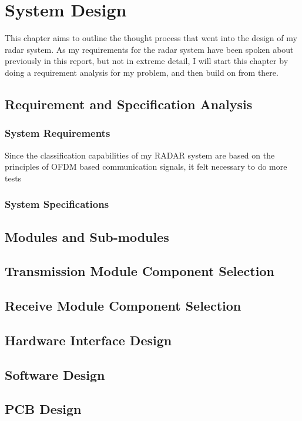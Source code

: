 \documentclass[class=report,11pt,crop=false]{standalone}
\begin{document}
\chapter{System Design \label{ch:systemdesign}}
This chapter aims to outline the thought process that went into the design of my radar system. As my requirements for the radar system have been spoken about previously in this report, but not in extreme detail, I will start this chapter by doing a requirement analysis for my problem, and then build on from there.

\section{Requirement and Specification Analysis}
\subsection{System Requirements}\label{subsec:systemreqs}
Since the classification capabilities of my RADAR system are based on the principles of OFDM based communication signals, it felt necessary to do more tests 


\subsection{System Specifications}\label{subsec:systemspecs}











\section{Modules and Sub-modules}

\section{Transmission Module Component Selection}



\section{Receive Module Component Selection}



\section{Hardware Interface Design}




\section{Software Design}\label{sec:softwaredesign}



\section{PCB Design}





\ifstandalone
\nocite{*}

\printnoidxglossary[type=\acronymtype,nonumberlist]
\fi
\end{document}
